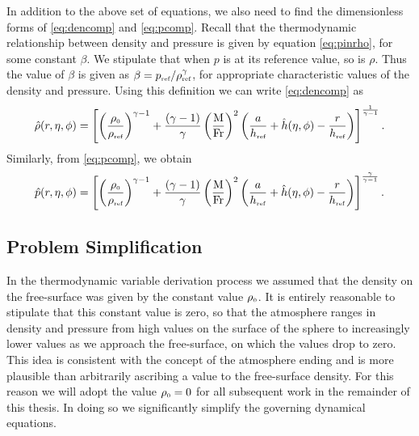 In addition to the above set of equations, we also need to find the dimensionless forms of \eqref{eq:dencomp} and \eqref{eq:pcomp}. Recall that the thermodynamic relationship between density and pressure is given by equation \eqref{eq:pinrho}, for some constant $\beta$. We stipulate that when $p$ is at its reference value, so is $\rho$. Thus the value of $\beta$ is given as $\beta=p_{\mbox{\tiny ref}}/\rho_{\mbox{\tiny ref}}^\gamma$, for appropriate characteristic values of the density and pressure. Using this definition we can write \eqref{eq:dencomp} as
\begin{equation}
\hat{\rho}(r,\eta,\phi) =\left[\left( \frac{\rho_{\scriptscriptstyle 0}}{\rho_{\mbox{\tiny ref}}} \right)^{\gamma-1}+\frac{(\gamma-1)}{\gamma}\left( \frac{\mbox{M}}{\mbox{Fr}}\right)^2 \left(\frac{a}{h_{\mbox{\tiny ref}}}+\hat{h}(\eta,\phi)-\frac{r}{h_{\mbox{\tiny ref}}}\right) \right]^{\frac{1}{\gamma-1}}. \label{eq:dencompnon}
\end{equation}
Similarly, from \eqref{eq:pcomp}, we obtain
\begin{equation}
\hat{p}(r,\eta,\phi) =\left[\left( \frac{\rho_{\scriptscriptstyle 0}}{\rho_{\mbox{\tiny ref}}} \right)^{\gamma-1}+\frac{(\gamma-1)}{\gamma}\left( \frac{\mbox{M}}{\mbox{Fr}}\right)^2 \left(\frac{a}{h_{\mbox{\tiny ref}}}+\hat{h}(\eta,\phi)-\frac{r}{h_{\mbox{\tiny ref}}}\right) \right]^{\frac{\gamma}{\gamma-1}}. \label{eq:pcompnon}
\end{equation}
\subsection{Problem Simplification}
\label{subsec:probsimp}
In the thermodynamic variable derivation process we assumed that the density on the free-surface was given by the constant value ${\rho_{\scriptscriptstyle 0}}$. It is entirely reasonable to stipulate that this constant value is zero, so that the atmosphere ranges in density and pressure from high values on the surface of the sphere to increasingly lower values as we approach the free-surface, on which the values drop to zero. This idea is consistent with the concept of the atmosphere ending and is more plausible than arbitrarily ascribing a value to the free-surface density. For this reason we will adopt the value ${\rho_{\scriptscriptstyle 0}}=0$ for all subsequent work in the remainder of this thesis. In doing so we significantly simplify the governing dynamical equations.

